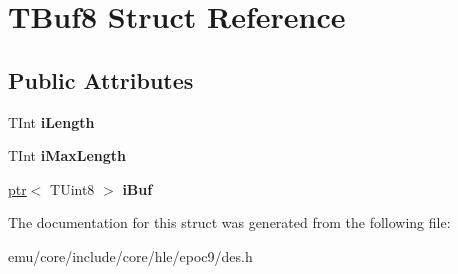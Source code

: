 \hypertarget{struct_t_buf8}{}\section{T\+Buf8 Struct Reference}
\label{struct_t_buf8}
\subsection*{Public Attributes}
\begin{DoxyCompactItemize}
\item 
\mbox{\label{struct_t_buf8_a3b98ed474aef4616501f30909c35d65d}} 
T\+Int {\bfseries i\+Length}
\item 
\mbox{\label{struct_t_buf8_ae4cd1538c89256c639246bc2a559cf5a}} 
T\+Int {\bfseries i\+Max\+Length}
\item 
\mbox{\label{struct_t_buf8_afd76089ca1058d7e6c04c32f8dd9727f}} 
\mbox{\hyperlink{classeka2l1_1_1ptr}{ptr}}$<$ T\+Uint8 $>$ {\bfseries i\+Buf}
\end{DoxyCompactItemize}


The documentation for this struct was generated from the following file\+:\begin{DoxyCompactItemize}
\item 
emu/core/include/core/hle/epoc9/des.\+h\end{DoxyCompactItemize}
